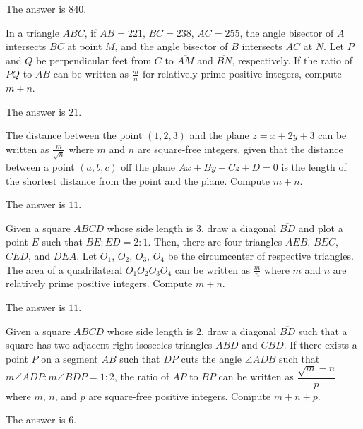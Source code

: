 \begin{solution}
The answer is $840$.
\end{solution}

\begin{problem}
In a triangle $ABC$, if $AB=221$, $BC=238$, $AC=255$, the angle bisector of $A$ intersects $\overline{BC}$ at point $M$, and the angle bisector of $B$ intersects $\overline{AC}$ at $N$. Let $P$ and $Q$ be perpendicular feet from $C$ to $\overline{AM}$ and $\overline{BN}$, respectively. If the ratio of $PQ$ to $AB$ can be written as $\frac{m}{n}$ for relatively prime positive integers, compute $m+n$.
\end{problem}

\begin{solution}
The answer is $21$.
\end{solution}

\begin{problem}
The distance between the point $(1,2,3)$ and the plane $z=x+2y+3$ can be written as $\frac{m}{\sqrt{n}}$ where $m$ and $n$ are square-free integers, given that the distance between a point $(a,b,c)$ off the plane $Ax+By+Cz+D=0$ is the length of the shortest distance from the point and the plane. Compute $m+n$.
\end{problem}

\begin{solution}
The answer is $11$.
\end{solution}

\begin{problem}
Given a square $ABCD$ whose side length is $3$, draw a diagonal $\overline{BD}$ and plot a point $E$ such that $BE:ED=2:1$. Then, there are four triangles $AEB$, $BEC$, $CED$, and $DEA$. Let $O_1$, $O_2$, $O_3$, $O_4$ be the circumcenter of respective triangles. The area of a quadrilateral $O_1O_2O_3O_4$ can be written as $\frac{m}{n}$ where $m$ and $n$ are relatively prime positive integers. Compute $m+n$.
\end{problem}

\begin{solution}
The answer is $11$.
\end{solution}

\begin{problem}
Given a square $ABCD$ whose side length is $2$, draw a diagonal $\overline{BD}$ such that a square has two adjacent right isosceles triangles $ABD$ and $CBD$. If there exists a point $P$ on a segment $\overline{AB}$ such that $\overline{DP}$ cuts the angle $\angle ADB$ such that $m\angle ADP : m \angle BDP = 1:2$, the ratio of $AP$ to $BP$ can be written as $\dfrac{\sqrt{m}-n}{p}$ where $m$, $n$, and $p$ are square-free positive integers. Compute $m+n+p$.
\end{problem}

\begin{solution}
The answer is $6$.
\end{solution}